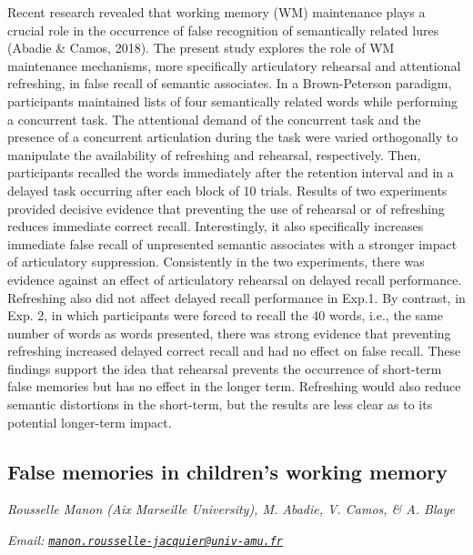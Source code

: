 \documentclass[12pt,]{book}
\begin{document}
Recent research revealed that working memory (WM) maintenance plays a crucial role in the occurrence of false recognition of semantically related lures (Abadie \& Camos, 2018). The present study explores the role of WM maintenance mechanisms, more specifically articulatory rehearsal and attentional refreshing, in false recall of semantic associates. In a Brown-Peterson paradigm, participants maintained lists of four semantically related words while performing a concurrent task. The attentional demand of the concurrent task and the presence of a concurrent articulation during the task were varied orthogonally to manipulate the availability of refreshing and rehearsal, respectively. Then, participants recalled the words immediately after the retention interval and in a delayed task occurring after each block of 10 trials. Results of two experiments provided decisive evidence that preventing the use of rehearsal or of refreshing reduces immediate correct recall. Interestingly, it also specifically increases immediate false recall of unpresented semantic associates with a stronger impact of articulatory suppression. Consistently in the two experiments, there was evidence against an effect of articulatory rehearsal on delayed recall performance. Refreshing also did not affect delayed recall performance in Exp.1. By contrast, in Exp. 2, in which participants were forced to recall the 40 words, i.e., the same number of words as words presented, there was strong evidence that preventing refreshing increased delayed correct recall and had no effect on false recall. These findings support the idea that rehearsal prevents the occurrence of short-term false memories but has no effect in the longer term. Refreshing would also reduce semantic distortions in the short-term, but the results are less clear as to its potential longer-term impact.

\hypertarget{false-memories-in-childrens-working-memory}{%
\subsection{False memories in children's working memory}\label{false-memories-in-childrens-working-memory}}

\emph{Rousselle Manon (Aix Marseille University), M. Abadie, V. Camos, \& A. Blaye}

\emph{Email: \href{mailto:manon.rousselle-jacquier@univ-amu.fr}{\nolinkurl{manon.rousselle-jacquier@univ-amu.fr}}}
\end{document}
